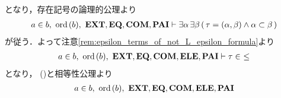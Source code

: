 \begin{prf}
\begin{description}
				となり，存在記号の論理的公理より
				\begin{align}
					a \in b,\ \operatorname*{ord}\hspace{0.15em}(b),\ \mbox{{\bf EXT}},\mbox{{\bf EQ}},\mbox{\bf COM},\mbox{{\bf PAI}} 
					\vdash \exists \alpha\, \exists \beta\, (\, \tau = (\alpha,\beta) \wedge \alpha \subset \beta\, )
				\end{align}
				が従う．よって注意\ref{rem:epsilon_terms_of_not_L_epsilon_formula}より
				\begin{align}
					a \in b,\ \ord{b},\ \EXTAX,\EQAX,\COMAX,\ELEAX,\PAIAX \vdash \tau \in\ \leq
					\label{fom:element_and_proper_subset_correspond_2}
				\end{align}
				となり，
				()と相等性公理より
				\begin{align}
					a \in b,\ \ord{b},\ \EXTAX,\EQAX,\COMAX,\ELEAX,\PAIAX 

\end{align}
\end{description}
\end{prf}
